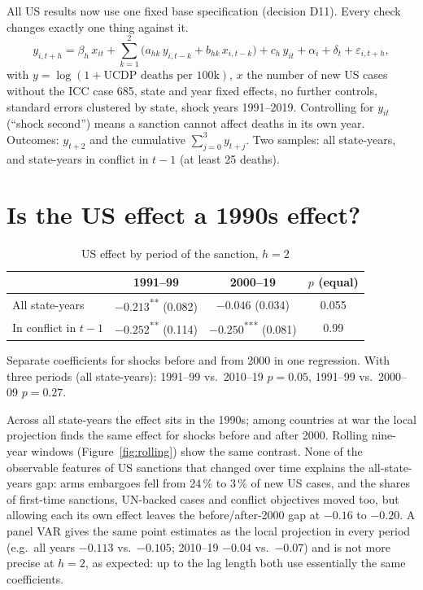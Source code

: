 \documentclass[11pt,a4paper]{article}
\newcommand{\sig}[1]{\textsuperscript{#1}}
\begin{document}
All US results now use one fixed base specification (decision D11). Every check changes exactly one thing against it.
\begin{equation}
y_{i,t+h} = \beta_h\, x_{it} + \sum_{k=1}^{2}\big(a_{hk}\, y_{i,t-k} + b_{hk}\, x_{i,t-k}\big) + c_h\, y_{it}
+ \alpha_i + \delta_t + \varepsilon_{i,t+h},
\label{eq:lp}
\end{equation}
with $y=\log(1+\text{UCDP deaths per 100k})$, $x$ the number of new US cases without the ICC case 685, state and
year fixed effects, no further controls, standard errors clustered by state, shock years 1991--2019. Controlling for
$y_{it}$ (``shock second'') means a sanction cannot affect deaths in its own year. Outcomes: $y_{t+2}$ and the
cumulative $\sum_{j=0}^{3}y_{t+j}$. Two samples: all state-years, and state-years in conflict in $t-1$ (at least 25
deaths).

\section{Is the US effect a 1990s effect?}
\label{sec:time}

\begin{table}[H]
\centering\small
\caption{US effect by period of the sanction, $h=2$}
\label{tab:periods}
\begin{threeparttable}
\begin{tabular}{@{}lccc@{}}
\toprule
& 1991--99 & 2000--19 & $p$ (equal) \\
\midrule
All state-years & $-0.213$\sig{**} (0.082) & $-0.046$ (0.034) & 0.055 \\
In conflict in $t-1$ & $-0.252$\sig{**} (0.114) & $-0.250$\sig{***} (0.081) & 0.99 \\
\bottomrule
\end{tabular}
\begin{tablenotes}\footnotesize
\item Separate coefficients for shocks before and from 2000 in one regression. With three periods (all state-years):
1991--99 vs.\ 2010--19 $p=0.05$, 1991--99 vs.\ 2000--09 $p=0.27$.
\end{tablenotes}
\end{threeparttable}
\end{table}

Across all state-years the effect sits in the 1990s; among countries at war the local projection finds the same
effect for shocks before and after 2000. Rolling nine-year windows (Figure~\ref{fig:rolling}) show the same contrast.
None of the observable features of US sanctions that changed over time explains the all-state-years gap: arms
embargoes fell from 24\,\% to 3\,\% of new US cases, and the shares of first-time sanctions, UN-backed cases and
conflict objectives moved too, but allowing each its own effect leaves the before/after-2000 gap at $-0.16$ to
$-0.20$. A panel VAR gives the same point estimates as the local projection in every period (e.g.\ all years $-0.113$
vs.\ $-0.105$; 2010--19 $-0.04$ vs.\ $-0.07$) and is not more precise at $h=2$, as expected: up to the lag length both
use essentially the same coefficients.
\end{document}
